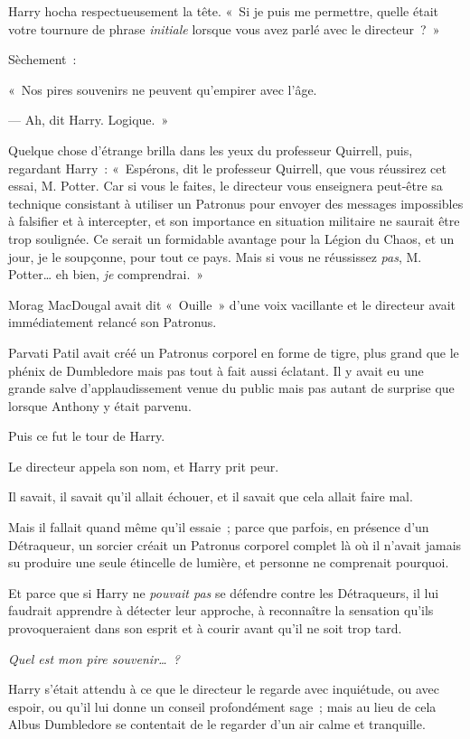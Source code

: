Harry hocha respectueusement la tête.
«~Si je puis me permettre, quelle était votre tournure de phrase \emph{initiale} lorsque vous avez parlé avec le directeur~?~»

Sèchement~:

«~Nos pires souvenirs ne peuvent qu'empirer avec l'âge.

--- Ah, dit Harry.
Logique.~»

Quelque chose d'étrange brilla dans les yeux du professeur Quirrell, puis, regardant Harry~: «~Espérons, dit le professeur Quirrell, que vous réussirez cet essai, M. Potter.
Car si vous le faites, le directeur vous enseignera peut-être sa technique consistant à utiliser un Patronus pour envoyer des messages impossibles à falsifier et à intercepter, et son importance en situation militaire ne saurait être trop soulignée.
Ce serait un formidable avantage pour la Légion du Chaos, et un jour, je le soupçonne, pour tout ce pays.
Mais si vous ne réussissez \emph{pas}, M. Potter… eh bien, \emph{je} comprendrai.~»

\later

Morag MacDougal avait dit «~Ouille~» d'une voix vacillante et le directeur avait immédiatement relancé son Patronus.

Parvati Patil avait créé un Patronus corporel en forme de tigre, plus grand que le phénix de Dumbledore mais pas tout à fait aussi éclatant.
Il y avait eu une grande salve d'applaudissement venue du public mais pas autant de surprise que lorsque Anthony y était parvenu.

Puis ce fut le tour de Harry.

Le directeur appela son nom, et Harry prit peur.

Il savait, il savait qu'il allait échouer, et il savait que cela allait faire mal.

Mais il fallait quand même qu'il essaie~; parce que parfois, en présence d'un Détraqueur, un sorcier créait un Patronus corporel complet là où il n'avait jamais su produire une seule étincelle de lumière, et personne ne comprenait pourquoi.

Et parce que si Harry ne \emph{pouvait pas} se défendre contre les Détraqueurs, il lui faudrait apprendre à détecter leur approche, à reconnaître la sensation qu'ils provoqueraient dans son esprit et à courir avant qu'il ne soit trop tard.

\emph{Quel est mon pire souvenir…~?}

Harry s'était attendu à ce que le directeur le regarde avec inquiétude, ou avec espoir, ou qu'il lui donne un conseil profondément sage~; mais au lieu de cela Albus Dumbledore se contentait de le regarder d'un air calme et tranquille.

